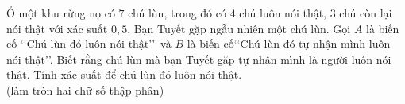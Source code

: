 \begin{ex}[CTST]%
Ở một khu rừng nọ có $7$ chú lùn, trong đó có $4$ chú luôn nói thật, $3$ chú còn lại nói thật với xác suất $0,5$. Bạn Tuyết gặp ngẫu nhiên một chú lùn. Gọi $A$ là biến cố \lq\lq Chú lùn đó luôn nói thật\rq\rq\, và $B$ là biến cố\lq\lq Chú lùn đó tự nhận mình luôn nói thật\rq\rq. Biết rằng chú lùn mà bạn Tuyết gặp tự nhận mình là người luôn nói thật. Tính xác suất để chú lùn đó luôn nói thật.\\
(làm tròn hai chữ số thập phân) 
\end{ex}

